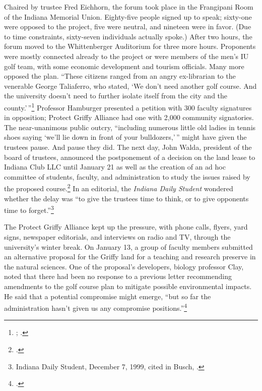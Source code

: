 \documentclass[
  american,
  letterpaper,
]{scrreprt}
\begin{document}
Chaired by trustee Fred Eichhorn, the forum took place in the Frangipani
Room of the Indiana Memorial Union. Eighty-five people signed up to
speak; sixty-one were opposed to the project, five were neutral, and
nineteen were in favor. (Due to time constraints, sixty-seven
individuals actually spoke.) After two hours, the forum moved to the
Whittenberger Auditorium for three more hours. Proponents were mostly
connected already to the project or were members of the men's IU golf
team, with some economic development and tourism officials. Many more
opposed the plan. ``These citizens ranged from an angry ex-librarian to
the venerable George Taliaferro, who stated, `We don't need another golf
course. And the university doesn't need to further isolate itself from
the city and the county.'\,''\footnote{; .} Professor Hamburger presented a petition with 300
faculty signatures in opposition; Protect Griffy Alliance had one with
2,000 community signatories. The near-unanimous public outcry,
``including numerous little old ladies in tennis shoes saying `we'll lie
down in front of your bulldozers,'\,'' might have given the trustees
pause. And pause they did. The next day, John Walda, president of the
board of trustees, announced the postponement of a decision on the land
lease to Indiana Club LLC until January 21 as well as the creation of an
ad hoc committee of students, faculty, and administration to study the
issues raised by the proposed course.\footnote{.} In an editorial, the
\emph{Indiana Daily Student} wondered whether the delay was ``to give
the trustees time to think, or to give opponents time to
forget.''\footnote{Indiana Daily Student, December 7, 1999, cited in
  Busch, .}

The Protect Griffy Alliance kept up the pressure, with phone calls,
flyers, yard signs, newspaper editorials, and interviews on radio and
TV, through the university's winter break. On January 13, a group of
faculty members submitted an alternative proposal for the Griffy land
for a teaching and research preserve in the natural sciences. One of the
proposal's developers, biology professor Clay, noted that there had been
no response to a previous letter recommending amendments to the golf
course plan to mitigate possible environmental impacts. He said that a
potential compromise might emerge, ``but so far the administration
hasn't given us any compromise positions.''\footnote{.}
\end{document}
